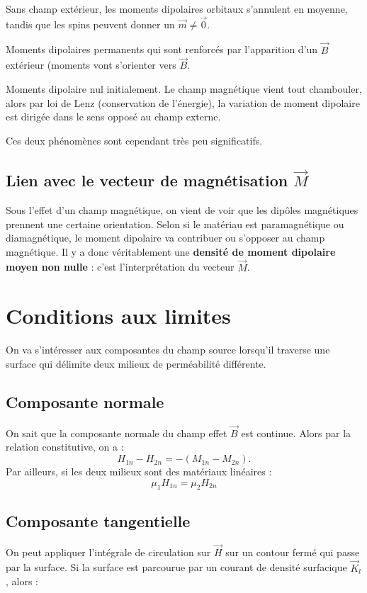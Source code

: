 \documentclass[12pt]{book}
\begin{document}
Sans champ extérieur, les moments dipolaires orbitaux s'annulent en moyenne, tandis que les spins peuvent donner un $\vec{m}\neq\vec{0}$. \\

\begin{description}[leftmargin=!,labelwidth=\widthof{\bfseries PParamagnétisme}]
\item[Paramagnétisme] Moments dipolaires permanents qui sont renforcés par l'apparition d'un $\vec{B}$ extérieur (moments vont s'orienter vers $\vec{B}$.
\item[Diamagnétisme] Moments dipolaire nul initialement. Le champ magnétique vient tout chambouler, alors par loi de Lenz (conservation de l'énergie), la variation de moment dipolaire est dirigée dans le sens opposé au champ externe.
\end{description}
Ces deux phénomènes sont cependant très peu significatifs.
\subsection{Lien avec le vecteur de magnétisation $\vec{M}$}
Sous l'effet d'un champ magnétique, on vient de voir que les dipôles magnétiques prennent une certaine orientation. Selon si le matériau est paramagnétique ou diamagnétique, le moment dipolaire va contribuer ou s'opposer au champ magnétique. Il y a donc véritablement une \textbf{densité de moment dipolaire moyen non nulle} : c'est l'interprétation du vecteur $\vec{M}$.

\section{Conditions aux limites}
On va s'intéresser aux composantes du champ source lorsqu'il traverse une surface qui délimite deux milieux de perméabilité différente.
\subsection{Composante normale}
On sait que la composante normale du champ effet $\vec{B}$ est continue. Alors par la relation constitutive, on a :$$H_{1n}-H_{2n} = -(M_{1n}-M_{2n}).$$
Par ailleurs, si les deux milieux sont des matériaux linéaires :
$$\mu_1H_{1n}=\mu_2H_{2n}$$
\subsection{Composante tangentielle}
On peut appliquer l'intégrale de circulation sur $\vec{H}$ sur un contour fermé qui passe par la surface. Si la surface est parcourue par un courant de densité surfacique $\vec{K}_l$, alors :
\end{document}
